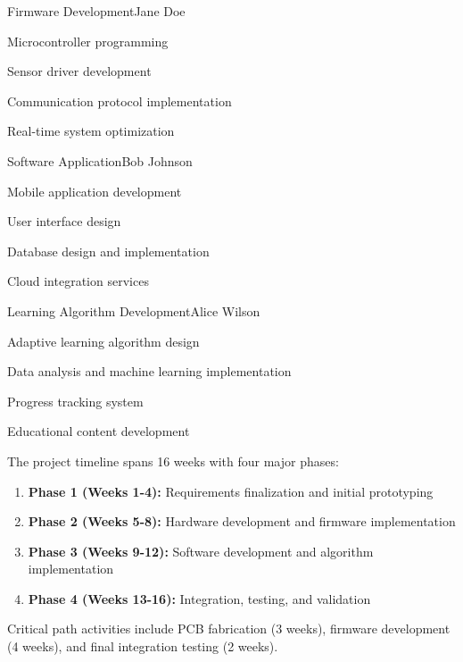 \documentclass[final]{designreport}
\begin{document}
\begin{subproject}{Firmware Development}{Jane Doe}
    \item Microcontroller programming
    \item Sensor driver development
    \item Communication protocol implementation
    \item Real-time system optimization
\end{subproject}

\begin{subproject}{Software Application}{Bob Johnson}
    \item Mobile application development
    \item User interface design
    \item Database design and implementation
    \item Cloud integration services
\end{subproject}

\begin{subproject}{Learning Algorithm Development}{Alice Wilson}
    \item Adaptive learning algorithm design
    \item Data analysis and machine learning implementation
    \item Progress tracking system
    \item Educational content development
\end{subproject}

\ganttchart
The project timeline spans 16 weeks with four major phases:
\begin{enumerate}
    \item \textbf{Phase 1 (Weeks 1-4):} Requirements finalization and initial prototyping
    \item \textbf{Phase 2 (Weeks 5-8):} Hardware development and firmware implementation
    \item \textbf{Phase 3 (Weeks 9-12):} Software development and algorithm implementation
    \item \textbf{Phase 4 (Weeks 13-16):} Integration, testing, and validation
\end{enumerate}

Critical path activities include PCB fabrication (3 weeks), firmware development (4 weeks), and final integration testing (2 weeks).

\costanalysis
\end{document}
